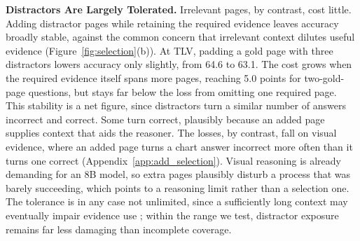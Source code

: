 \documentclass[11pt]{article}
\begin{document}
\textbf{Distractors Are Largely Tolerated.}
Irrelevant pages, by contrast, cost little. Adding distractor pages while retaining the required evidence leaves accuracy broadly stable, against the common concern that irrelevant context dilutes useful evidence (Figure~\ref{fig:selection}(b)). At TLV, padding a gold page with three distractors lowers accuracy only slightly, from 64.6 to 63.1. The cost grows when the required evidence itself spans more pages, reaching 5.0 points for two-gold-page questions, but stays far below the loss from omitting one required page. This stability is a net figure, since distractors turn a similar number of answers incorrect and correct. Some turn correct, plausibly because an added page supplies context that aids the reasoner. The losses, by contrast, fall on visual evidence, where an added page turns a chart answer incorrect more often than it turns one correct (Appendix~\ref{app:add_selection}). Visual reasoning is already demanding for an 8B model, so extra pages plausibly disturb a process that was barely succeeding, which points to a reasoning limit rather than a selection one. The tolerance is in any case not unlimited, since a sufficiently long context may eventually impair evidence use \citep{liu2024lost,wang2024mmniah}; within the range we test, distractor exposure remains far less damaging than incomplete coverage.

\end{document}
